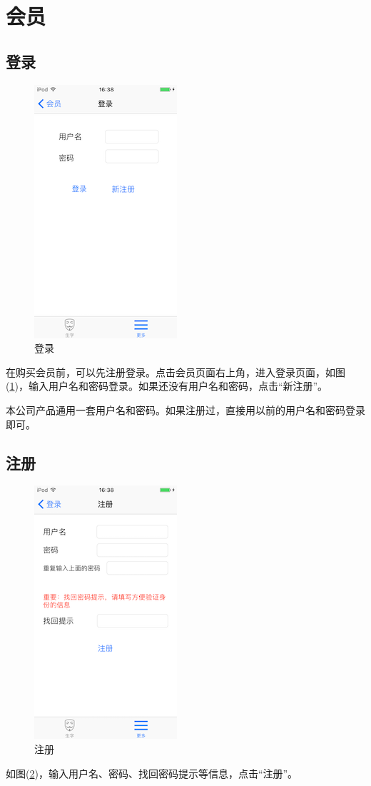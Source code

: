 \section{会员}

\subsection{登录}
\begin{figure}[H]
	\centering
	\includegraphics{img/10.png}
	\caption{登录}
	\label{img10}
\end{figure}
在购买会员前，可以先注册登录。点击会员页面右上角，进入登录页面，如图(\ref{img10})，输入用户名和密码登录。如果还没有用户名和密码，点击“新注册”。

本公司产品通用一套用户名和密码。如果注册过，直接用以前的用户名和密码登录即可。

\subsection{注册}
\begin{figure}[H]
	\centering
	\includegraphics{img/11.png}
	\caption{注册}
	\label{img11}
\end{figure}
如图(\ref{img11})，输入用户名、密码、找回密码提示等信息，点击“注册”。

